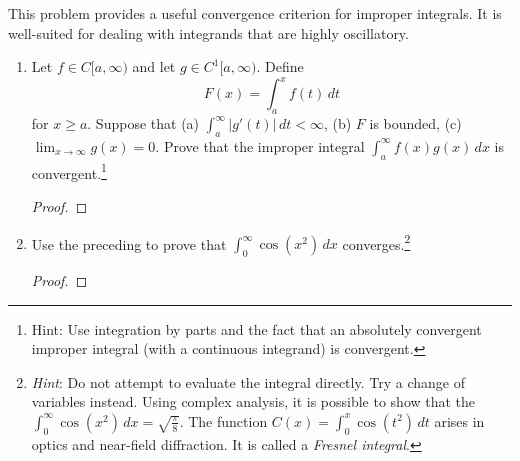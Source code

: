 \documentclass{../homework}
\begin{document}
\begin{Exercise}
	This problem provides a useful convergence criterion for improper
  integrals.  It is well-suited for dealing with integrands that are
  highly oscillatory.
	\begin{enumerate}
  \item Let $f \in C[a,\infty)$ and let $g \in C^1[a,\infty)$.  Define
    \begin{equation*}
      F(x) = \int_a^x f(t)\,dt
    \end{equation*}
    for $x \geq a$.  Suppose that (a)
    $\int_a^{\infty} |g'(t)|\,dt < \infty$, (b) $F$ is bounded, (c)
    $\lim_{x\to\infty} g(x) = 0$.  Prove that the improper integral
    $\int_a^{\infty} f(x) g(x)\,dx$ is convergent.\footnote{Hint: Use
      integration by parts and the fact that an absolutely convergent
      improper integral (with a continuous integrand) is convergent.}

    \begin{solution}
      \begin{proof}

      \end{proof}
    \end{solution}

  \item Use the preceding to prove that
    $\int_0^{\infty} \cos(x^2)\,dx$ converges.\footnote{\emph{Hint}:
      Do not attempt to evaluate the integral directly.  Try a change
      of variables instead.  Using complex analysis, it is possible to
      show that the
      $\int_0^{\infty} \cos(x^2)\,dx = \sqrt{ \frac{\pi}{8} }$.  The
      function $C(x) = \int_0^x \cos(t^2)\,dt$ arises in optics and
      near-field diffraction.  It is called a \emph{Fresnel
        integral}.}

    \begin{solution}
      \begin{proof}

      \end{proof}
    \end{solution}
	\end{enumerate}
\end{Exercise}
\end{document}

